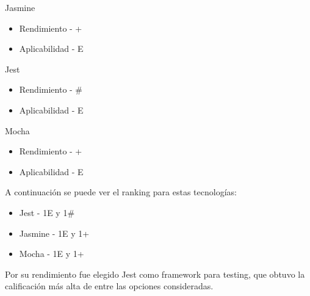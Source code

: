 \documentclass{article}
\begin{document}
Jasmine
\begin{itemize}
    \item Rendimiento - +
    \item Aplicabilidad - E
\end{itemize}
Jest
\begin{itemize}
    \item Rendimiento - \#
    \item Aplicabilidad - E 
\end{itemize}
Mocha
\begin{itemize}
    \item Rendimiento - +
    \item Aplicabilidad - E
\end{itemize}
A continuación se puede ver el ranking para estas tecnologías:
\begin{itemize}
    \item Jest -  1E y 1\#
    \item Jasmine - 1E y 1+
    \item Mocha - 1E y 1+
\end{itemize}
Por su rendimiento fue elegido Jest como framework para testing, que obtuvo la calificación más alta de entre las opciones consideradas.
\end{document}
